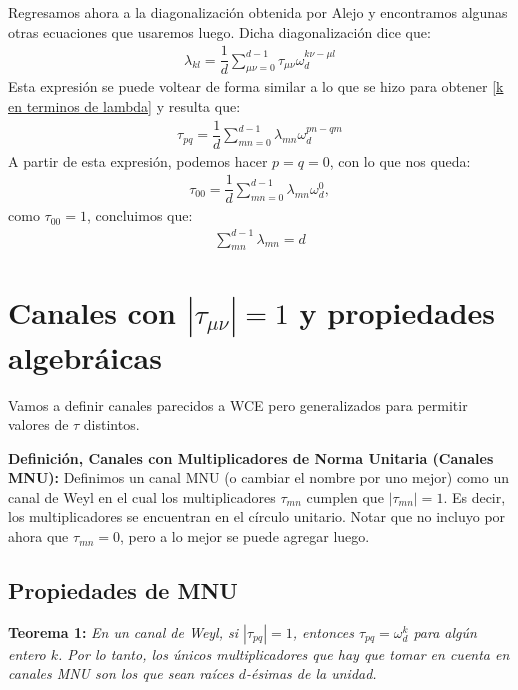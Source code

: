 Regresamos ahora a la diagonalización obtenida por Alejo  y encontramos algunas otras ecuaciones que usaremos luego. Dicha diagonalización dice que:
\begin{align*}
\lambda_{kl} = \dfrac{1}{d} \sum_{\mu \nu = 0}^{d-1} \tau_{\mu \nu} \omega_d^{k \nu - \mu l}
\end{align*}
Esta expresión se puede voltear de forma similar a lo que se hizo para obtener \ref{k en terminos de lambda} y resulta que:
\begin{align}
\label{tau en termino de lambda}
\tau_{pq} = \dfrac{1}{d} \sum_{mn=0}^{d-1} \lambda_{mn} \omega_d^{pn-qm}
\end{align}
A partir de esta expresión, podemos hacer $p=q=0$, con lo que nos queda:
\begin{align*}
\tau_{00} = \dfrac{1}{d} \sum_{mn=0}^{d-1} \lambda_{mn} \omega_d^0,
\end{align*}
como $\tau_{00}=1$, concluimos que:
\begin{align}
\label{suma-lambdas}
\sum_{mn}^{d-1}\lambda_{mn} = d
\end{align}

\section{Canales con $|\tau_{\mu\nu}|=1$ y propiedades algebráicas} %

Vamos a definir canales parecidos a WCE pero generalizados para permitir
valores de $\tau$ distintos. 

\textbf{Definición, Canales con Multiplicadores de Norma Unitaria (Canales MNU):} Definimos un canal MNU
(o cambiar el nombre por uno mejor) como un canal de Weyl en el cual los
multiplicadores $\tau_{mn}$ cumplen que $|\tau_{mn}|= 1$.  Es decir, los
multiplicadores se encuentran en el círculo unitario. Notar que no incluyo por
ahora que $\tau_{mn} = 0$, pero a lo mejor se puede agregar luego. 





\subsection{Propiedades de MNU}



\textbf{Teorema 1:} \textit{En un canal de Weyl, si $|\tau_{pq}| = 1$, entonces $\tau_{pq} = \omega_d^{k}$ para algún entero $k$. Por lo tanto, los únicos multiplicadores que hay que tomar en cuenta en canales MNU son los que sean raíces $d$-ésimas de la unidad.} \\

